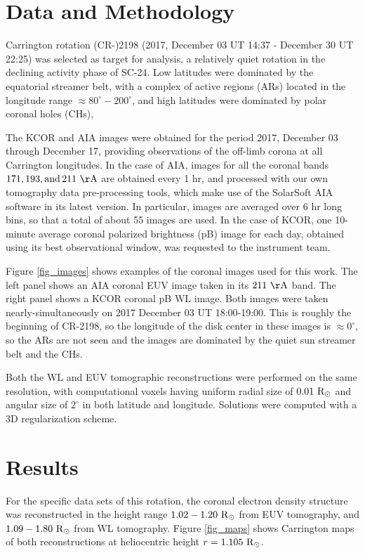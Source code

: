 \documentclass[baaa]{baaa}
\begin{document}
\section{Data and Methodology}\label{method}

Carrington rotation (CR-)2198 (2017, December 03 UT 14:37 - December 30	UT 22:25) was selected as target for analysis, a relatively quiet rotation in the declining activity phase of SC-24. Low latitudes were dominated by the equatorial streamer belt, with a complex of active regions (ARs) located in the longitude range $\approx 80^\circ-200^\circ$, and high latitudes were dominated by polar coronal holes (CHs),  

The KCOR and AIA images were obtained for the period 2017, December 03 through December 17, providing observations of the off-limb corona at all Carrington longitudes. In the case of AIA, images for all the coronal bands $171, 193, \rm{and}\, 211~\AA$ are obtained every 1 hr, and processed with our own tomography data pre-processing tools, which make use of the SolarSoft AIA software in its latest version. In particular, images are averaged over 6 hr long bins, so that a total of about 55 images are used. In the case of KCOR, one 10-minute average coronal polarized brightness (pB) image for each day, obtained using its best observational window, was requested to the instrument team.

Figure \ref{fig_images} shows examples of the coronal images used for this work. The left panel shows an AIA coronal EUV image taken in its $211~\rm{\AA}$ band. The right panel shows a KCOR coronal pB WL image. Both images were taken nearly-simultaneously on 2017 December 03 UT 18:00-19:00. This is roughly the beginning of CR-2198, so the longitude of the disk center in these images is $\approx 0^\circ$, so the ARs are not seen and the images are dominated by the quiet sun streamer belt and the CHs.

Both the WL and EUV tomographic reconstructions were performed on the same resolution, with computational voxels having uniform radial size of $0.01~\rm{R}_\odot$ and angular size of $2^\circ$ in both latitude and longitude. Solutions were computed with a 3D regularization scheme.

\section{Results}

For the specific data sets of this rotation, the coronal electron density structure was reconstructed in the height range $1.02-1.20~\rm{R}_\odot$ from EUV tomography, and $1.09-1.80~\rm{R}_\odot$ from WL tomography. Figure \ref{fig_maps} shows Carrington maps of both reconstructions at heliocentric height $r=1.105~\rm{R}_\odot$. 
\end{document}
